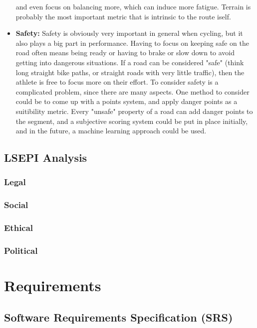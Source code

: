 \documentclass[11pt,twoside]{report}
\begin{document}
\begin{itemize}
	      and even focus on balancing more, which can induce more fatigue. Terrain is probably the most important metric that is intrinsic to the route iself.
	\item \textbf{Safety:} Safety is obviously very important in general when cycling, but it also plays a big part in performance. Having to focus on keeping safe on the road often means
	      being ready or having to brake or slow down to avoid getting into dangerous situations. If a road can be considered "safe" (think long straight bike paths, or straight roads with very little traffic), then
	      the athlete is free to focus more on their effort. To consider safety is a complicated problem, since there are many aspects. One method to consider could be to come up with a points system, and apply danger points
	      as a suitibility metric. Every "unsafe" property of a road can add danger points to the segment, and a subjective scoring system could be put in place initially, and in the future, a machine learning approach could be used.
\end{itemize}


\section{LSEPI Analysis}
\subsection{Legal}
\subsection{Social}
\subsection{Ethical}
\subsection{Political}
\label{sec:lsepi}

\chapter{Requirements}
\label{chap:requirements}
\section{Software Requirements Specification (SRS)}
\label{sec:srs}
\end{document}
